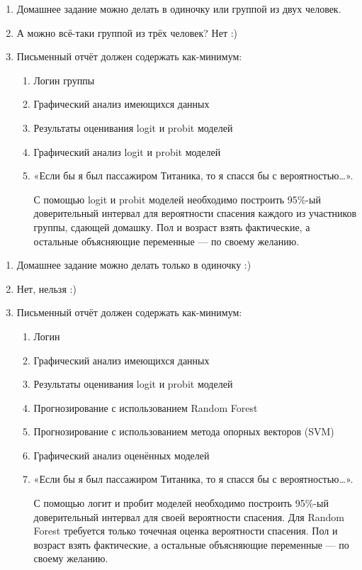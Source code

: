 \documentclass[12pt, a4paper]{article}\usepackage[]{graphicx}\usepackage[]{color}
\begin{document}
\begin{enumerate}
\item Домашнее задание можно делать в одиночку или группой из двух человек.
\item А можно всё-таки группой из трёх человек? Нет :)
\item Письменный отчёт  должен содержать как-минимум:
\begin{enumerate}
\item Логин группы
\item Графический анализ имеющихся данных
\item Результаты оценивания logit и probit моделей
\item Графический анализ logit и probit моделей
\item «Если бы я был пассажиром Титаника, то я спасся бы с вероятностью\ldots».

С помощью logit и probit моделей необходимо построить 95\%-ый доверительный интервал для вероятности спасения каждого из участников группы, сдающей домашку. Пол и возраст взять фактические, а остальные объясняющие переменные — по своему желанию.
\end{enumerate}
\end{enumerate}


\vspace{15pt}
\RedRoseLine
\vspace{15pt}


\begin{enumerate}
\item Домашнее задание можно делать только в одиночку :)
\item Нет, нельзя :)
\item Письменный отчёт  должен содержать как-минимум:
\begin{enumerate}
\item Логин
\item Графический анализ имеющихся данных
\item Результаты оценивания logit и probit моделей
\item Прогнозирование с использованием Random Forest
\item Прогнозирование с использованием метода опорных векторов (SVM)
\item Графический анализ оценённых моделей
\item «Если бы я был пассажиром Титаника, то я спасся бы с вероятностью\ldots».

С помощью логит и пробит моделей необходимо построить 95\%-ый доверительный интервал для своей вероятности спасения. Для Random Forest требуется только точечная оценка вероятности спасения. Пол и возраст взять фактические, а остальные объясняющие переменные — по своему желанию.
\end{enumerate}
\end{enumerate}
\end{document}
